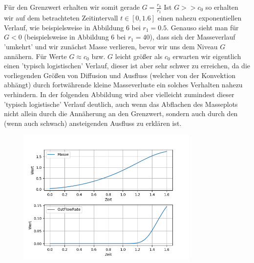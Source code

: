 Für den Grenzwert erhalten wir somit gerade $G = \frac{r_0}{r_1}$
Ist $G >> c_0 $ so erhalten wir auf dem betrachteten Zeitintervall $t \in [0,1.6]$ einen nahezu exponentiellen Verlauf, wie beispielsweise in  Abbildung 6 bei $r_1 = 0.5$. Genauso sieht man für $G<0$ (beispielsweise in Abbildung 6 bei $r_1 = 40$), dass sich der Masseverlauf 'umkehrt' und wir zunächst Masse verlieren, bevor wir uns dem Niveau $G$ annähern.
Für Werte $G \approx c_0 $ bzw. $G$ leicht größer als $c_0$ erwarten wir eigentlich einen 'typisch logistischen' Verlauf, dieser ist aber sehr schwer zu erreichen, da die vorliegenden Größen von Diffusion und Ausfluss (welcher von der Konvektion abhängt) durch fortwährende kleine Masseverluste ein solches Verhalten nahezu verhindern.
\newline
In der folgenden Abbildung wird aber vielleicht zumindest dieser 'typisch logistische' Verlauf deutlich, auch wenn das Abflachen des Masseplots nicht allein durch die Annäherung an den Grenzwert, sondern auch durch den (wenn auch schwach) ansteigenden Ausfluss zu erklären ist. 
\begin{figure}[H]
	\centering
	\includegraphics[width=0.80\textwidth]{../Aufgabe30/Testvltgut/plot.png}
\end{figure}

